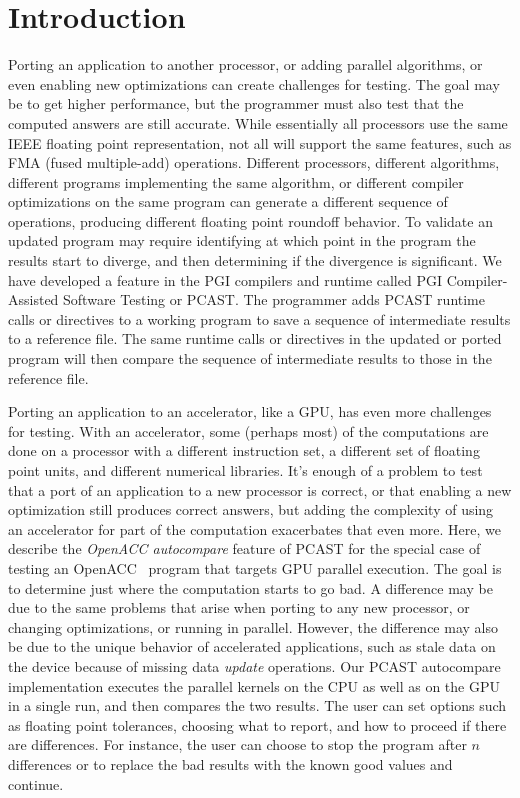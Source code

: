 \section{Introduction}

Porting an application to another processor, or adding parallel algorithms, or even enabling new optimizations can create challenges for testing.
The goal may be to get higher performance, but the programmer must also test that the computed answers are still accurate.
While essentially all processors use the same IEEE floating point representation, not all will support the same features, such as FMA (fused multiple-add) operations.
Different processors, different algorithms, different programs implementing the same algorithm, or different compiler optimizations on the same program can generate a different sequence of operations, producing different floating point roundoff behavior.
To validate an updated program may require identifying at which point in the program the results start to diverge, and then determining if the divergence is significant.
We have developed a feature in the PGI compilers and runtime called PGI Compiler-Assisted Software Testing or PCAST.
The programmer adds PCAST runtime calls or directives to a working program to save a sequence of intermediate results to a reference file.
The same runtime calls or directives in the updated or ported program will then compare the sequence of intermediate results to those in the reference file.

Porting an application to an accelerator, like a GPU, has even more challenges for testing.
With an accelerator, some (perhaps most) of the computations are done on a processor with a different instruction set, a different set of floating point units, and different numerical libraries.
It's enough of a problem to test that a port of an application to a new processor is correct, or that enabling a new optimization still produces correct answers, but adding the complexity of using an accelerator for part of the computation exacerbates that even more.
Here, we describe the \emph{OpenACC autocompare} feature of PCAST for the special case of testing an OpenACC~\cite{openacc.16} program that targets GPU parallel execution.
The goal is to determine just where the computation starts to go bad.
A difference may be due to the same problems that arise when porting to any new processor, or changing optimizations, or running in parallel.
However, the difference may also be due to the unique behavior of accelerated applications, such as stale data on the device because of missing data \emph{update} operations.
Our PCAST autocompare implementation executes the parallel kernels on the CPU as well as on the GPU in a single run, and then compares the two results.
The user can set options such as floating point tolerances, choosing what to report, and how to proceed if there are differences.
For instance, the user can choose to stop the program after $n$ differences or to replace the bad results with the known good values and continue.


